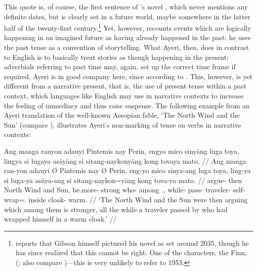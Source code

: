 This quote is, of course, the first sentence of 
\citet{gibson:neuromancer}'s novel , which 
never mentions any definite dates, but is clearly set in a future world, maybe 
somewhere in the latter half of the twenty-first century.\footnote{%
\citet{christian2017} reports that Gibson himself pictured his novel as set 
around 2035, though he has since realized that this cannot be right. One of 
the characters, the Finn,  (\cite{christian2017}; also compare 
\cite[92]{gibson:neuromancer})---this is very unlikely to refer to 1953.} Yet, 
however, \citet{gibson:neuromancer} recounts events which are logically 
happening in an imagined future as having already happened in the past: he 
uses the past tense as a convention of storytelling. What Ayeri, then, does in 
contrast to English is to basically treat stories as though happening in the 
present; adverbials referring to past time may, again, set up the correct time 
frame if required. Ayeri is in good company here, since according to 
\citet{dahl1985} . This, however, is 
yet different from a narrative present, that is, the use of present tense 
within a past context, which languages like English may use in narrative 
contexts to increase the feeling of immediacy and thus raise suspense. The 
following example from an Ayeri translation of the well-known Aesopian fable, 
`The North Wind and the Sun' (compare \cite[39]{ipa2007}), illustrates 
Ayeri's non-marking of tense on verbs in narrative contexts:

\ex
\begingl
	\gla Ang manga ranyon adauyi {} Pintemis nay {} Perin, engyo mico 
		sinyāng luga toya, lingya si lugaya asāyāng si sitang-naykonyāng 
		kong tovaya mato. //
	\glb Ang manga ran-yon adauyi Ø Pintemis nay Ø Perin, eng-yo mico 
		sinya-ang luga toya, ling-ya si luga-ya asāya-ang si 
		sitang-naykon=yāng kong tova-ya mato. //
	\glc \AgtT{} \Prog{} argue-\TplN{} then \Top{} {North Wind} and 
		\Top{} Sun, be.more-\TsgN{} strong who-\Aarg{} among 
		\TplN{}.\Loc{}, while-\Loc{} \Rel{} pass-\TsgM{} 
		traveler-\Aarg{} \Rel{} self-wrap=\TsgM{}.\Aarg{} inside 
		cloak-\Loc{} warm. //
	\glft `The North Wind and the Sun were then arguing which among them is 
		stronger, all the while a traveler passed by who had wrapped 
		himself in a warm cloak.' //
\endgl
\xe

